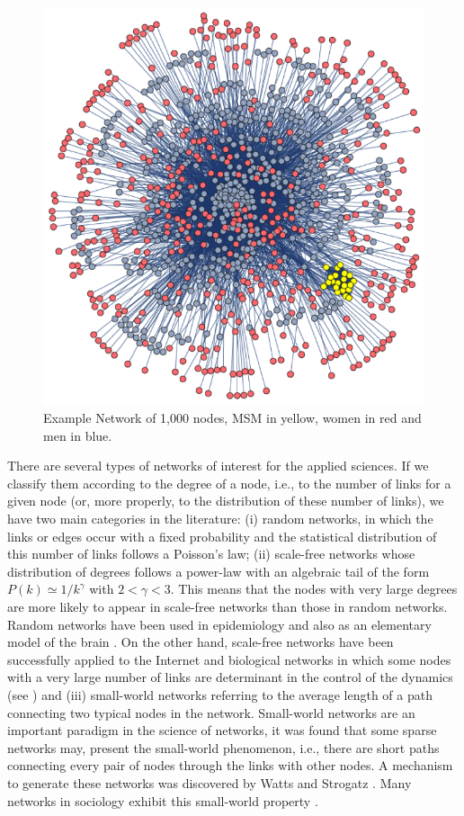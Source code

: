 \begin{figure}[ht]
	\centering
	\includegraphics[scale=0.7]{IMG/LSPasd.png}
	\caption{Example Network of 1,000 nodes, MSM in yellow, women in red and men in blue.}
	\label{LSPnetwork}
\end{figure}


There are several types of networks of interest for the applied sciences. If we classify them according to the degree of a node, i.e., to the number of links for a given node (or, more properly, to the distribution of these number of links), we have two main categories in the literature: (i) random networks, in which the links or edges occur with a fixed probability and the statistical distribution of this number of links follows a Poisson's law; (ii) scale-free networks whose distribution of degrees follows a power-law with an algebraic tail of the form $P(k) \simeq 1/k^\gamma$ with $2 < \gamma < 3$. This means that the nodes with very large degrees are more likely to appear in scale-free networks than those in random networks. Random networks have been used in epidemiology \cite{acedo2011using} and also as an elementary model of the brain \cite{acedo2013brain}. On the other hand, scale-free networks have been successfully applied to the Internet and biological networks in which some nodes with a very large number of links are determinant in the control of the dynamics (see \cite{dorogovtsev2013evolution}) and (iii) small-world networks referring to the average length of a path connecting two typical nodes in the network. Small-world networks are an important paradigm in the science of networks, it was found that some sparse networks may, present the small-world phenomenon, i.e., there are short paths connecting every pair of nodes through the links with other nodes. A mechanism to generate these networks was discovered by Watts and Strogatz \cite{watts1998collective}. Many networks in sociology exhibit this small-world property \cite{christakis2007spread,liljeros2001web,bearman2004chains}.

